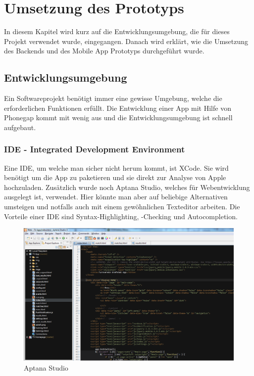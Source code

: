 %
%

\chapter{Umsetzung des Prototyps}\label{chap.umsetzung}
In diesem Kapitel wird kurz auf die Entwicklungsumgebung, die für dieses Projekt verwendet wurde, eingegangen. Danach wird erklärt, wie die Umsetzung des Backends und des Mobile App Prototyps durchgeführt wurde.

\section{Entwicklungsumgebung}\label{entwicklungsumgebung}
Ein Softwareprojekt benötigt immer eine gewisse Umgebung, welche die erforderlichen Funktionen erfüllt. Die Entwicklung einer App mit Hilfe von Phonegap kommt mit wenig aus und die Entwicklungsumgebung ist schnell aufgebaut.

\subsection{IDE - Integrated Development Environment}
Eine IDE, um welche man sicher nicht herum kommt, ist XCode. Sie wird benötigt um die App zu paketieren und sie direkt zur Analyse von Apple hochzuladen. Zusätzlich wurde noch Aptana Studio, welches für Webentwicklung ausgelegt ist, verwendet. Hier könnte man aber auf beliebige Alternativen umsteigen und notfalls auch mit einem gewöhnlichen Texteditor arbeiten. Die Vorteile einer IDE sind Syntax-Highlighting, -Checking und Autocompletion.

\begin{figure}[h]
\centering
\includegraphics[scale=0.5]{images/aptana.png}
\caption{Aptana Studio}
\label{fig:aptana}
\end{figure}


